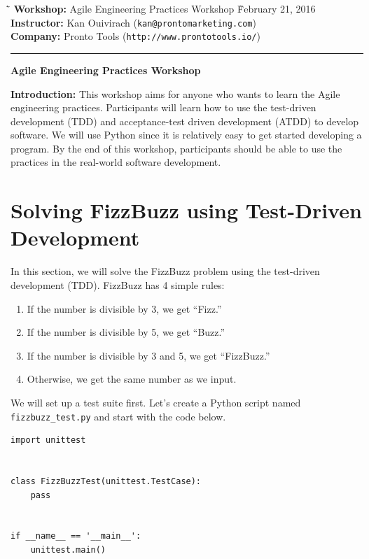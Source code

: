 \documentclass{article}
\begin{document}
\begin{tabbing}
  \`\=\kill
  \textbf{Workshop:} Agile Engineering Practices Workshop
  \` February 21, 2016 \\
  \textbf{Instructor:} Kan Ouivirach ({\tt \small kan@prontomarketing.com}) \\
  \textbf{Company:} Pronto Tools ({\tt \small http://www.prontotools.io/})
\end{tabbing}

\hrule

\vspace{.25in}

\begin{center}
  \textbf{\Large Agile Engineering Practices Workshop}
\end{center}

\vspace{.15in}

\noindent \textbf{Introduction:} This workshop aims for anyone who wants to
learn the Agile engineering practices. Participants will learn how to use the
test-driven development (TDD) and acceptance-test driven development (ATDD) to
develop software. We will use Python since it is relatively easy to get started
developing a program. By the end of this workshop, participants should be able
to use the practices in the real-world software development.

\section*{Solving FizzBuzz using Test-Driven Development}

\noindent In this section, we will solve the FizzBuzz problem using the
test-driven development (TDD). FizzBuzz has 4 simple rules:

\begin{enumerate}
  \item If the number is divisible by 3, we get ``Fizz.''
  \item If the number is divisible by 5, we get ``Buzz.''
  \item If the number is divisible by 3 and 5, we get ``FizzBuzz.''
  \item Otherwise, we get the same number as we input.
\end{enumerate}

\noindent We will set up a test suite first. Let's create a Python script named
{\tt fizzbuzz\_test.py} and start with the code below.

\begin{verbatim}
import unittest


class FizzBuzzTest(unittest.TestCase):
    pass


if __name__ == '__main__':
    unittest.main()
\end{verbatim}
\end{document}
